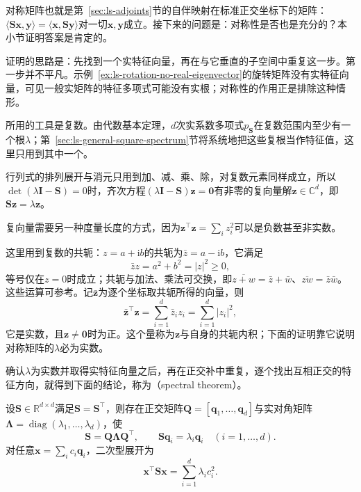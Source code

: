 对称矩阵也就是第~\ref{sec:ls-adjoints}节的自伴映射在标准正交坐标下的矩阵：$\langle\bm S\bm x,\bm y\rangle=\langle\bm x,\bm S\bm y\rangle$对一切$\bm x,\bm y$成立。接下来的问题是：对称性是否也是充分的？本小节证明答案是肯定的。

证明的思路是：先找到一个实特征向量，再在与它垂直的子空间中重复这一步。第一步并不平凡。示例~\ref{ex:ls-rotation-no-real-eigenvector}的旋转矩阵没有实特征向量，可见一般实矩阵的特征多项式可能没有实根；对称性的作用正是排除这种情形。

所用的工具是复数。由代数基本定理，$d$次实系数多项式$p_{\bm S}$在复数范围内至少有一个根$\lambda$；第~\ref{sec:ls-general-square-spectrum}节将系统地把这些复根当作特征值，这里只用到其中一个。

行列式的排列展开与消元只用到加、减、乘、除，对复数元素同样成立，所以$\det(\lambda\bm I-\bm S)=0$时，齐次方程$(\lambda\bm I-\bm S)\bm z=\bm0$有非零的复向量解$\bm z\in\mathbb C^d$，即$\bm S\bm z=\lambda\bm z$。

复向量需要另一种度量长度的方式，因为$\bm z^\top\bm z=\sum_iz_i^2$可以是负数甚至非实数。

这里用到复数的共轭：$z=a+\mathrm ib$的共轭为$\bar z=a-\mathrm ib$，它满足
\[
 \bar zz=a^2+b^2=|z|^2\geq0,
\]
等号仅在$z=0$时成立；共轭与加法、乘法可交换，即$\overline{z+w}=\bar z+\bar w$、$\overline{zw}=\bar z\bar w$。这些运算可参考。记$\bar{\bm z}$为逐个坐标取共轭所得的向量，则
\[
 \bar{\bm z}^\top\bm z=\sum_{i=1}^d\bar z_iz_i=\sum_{i=1}^d|z_i|^2,
\]
它是实数，且$\bm z\neq\bm0$时为正。这个量称为$\bm z$与自身的共轭内积；下面的证明靠它说明对称矩阵的$\lambda$必为实数。

确认$\lambda$为实数并取得实特征向量之后，再在正交补中重复，逐个找出互相正交的特征方向，就得到下面的结论，称为（spectral theorem）。

\begin{theorem}[谱定理]
\label{thm:ls-real-symmetric-spectral}
\label{thm:matrix-analysis-symmetric-spectral-theorem}
\label{sec:ch06-triangular-spectrum}
设$\bm S\in\mathbb R^{d\times d}$满足$\bm S=\bm S^\top$，则存在正交矩阵$\bm Q=[\bm q_1,\ldots,\bm q_d]$与实对角矩阵$\bm\Lambda=\operatorname{diag}(\lambda_1,\dots,\lambda_d)$，使
\begin{equation}
 \bm S=\bm Q\bm\Lambda\bm Q^\top,\qquad \bm S\bm q_i=\lambda_i\bm q_i\quad(i=1,\ldots,d).
 \label{eq:matrix-analysis-symmetric-eigendecomposition}
\end{equation}
对任意$\bm x=\sum_i c_i\bm q_i$，二次型展开为
\begin{equation}
 \bm x^\top\bm S\bm x=\sum_{i=1}^d\lambda_i c_i^2.
 \label{eq:matrix-analysis-quadratic-spectral-form}
\end{equation}
\end{theorem}

